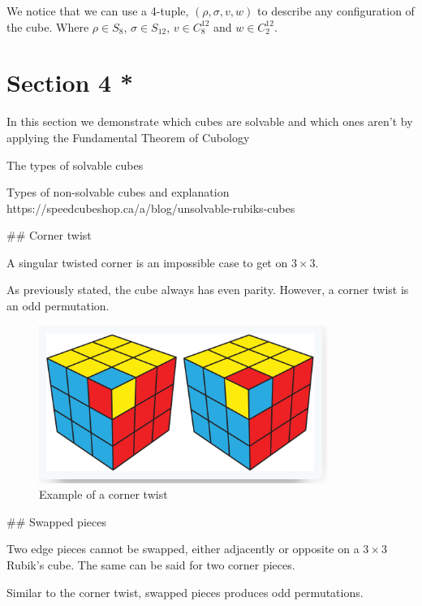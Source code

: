 We notice that we can use a 4-tuple, \((\rho, \sigma,v,w)\) to describe
any configuration of the cube. Where \(\rho \in S_8\),
\(\sigma \in S_{12}\), \(v \in C_8^{12}\) and \(w \in C_2^{12}\).

\section{Section 4 *}\label{section-4}

In this section we demonstrate which cubes are solvable and which ones
aren't by applying the Fundamental Theorem of Cubology

The types of solvable cubes

Types of non-solvable cubes and explanation
https://speedcubeshop.ca/a/blog/unsolvable-rubiks-cubes

\#\# Corner twist

A singular twisted corner is an impossible case to get on
\(3 \times 3\).

As previously stated, the cube always has even parity. However, a corner
twist is an odd permutation.

\begin{figure}
\centering
\includegraphics{Screenshot from 2024-03-24 08-41-47-1.png}
\caption{Example of a corner twist}
\end{figure}

\#\# Swapped pieces

Two edge pieces cannot be swapped, either adjacently or opposite on a
\(3 \times 3\) Rubik's cube. The same can be said for two corner pieces.

Similar to the corner twist, swapped pieces produces odd permutations.

